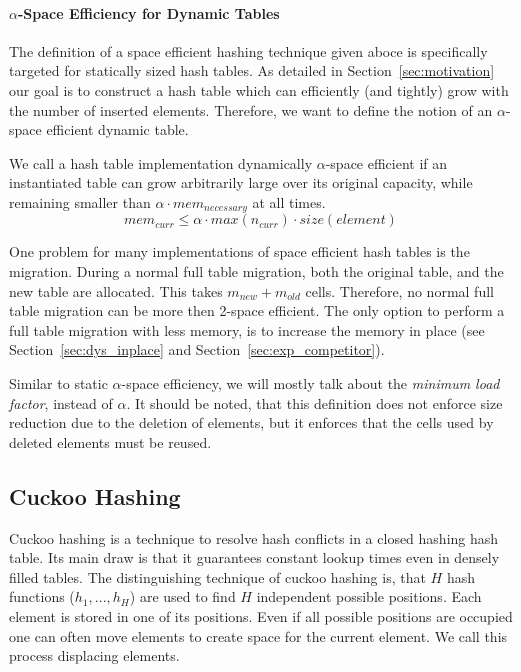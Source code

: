 \documentclass[a4paper,UKenglish]{lipics-v2016}
\begin{document}
\paragraph*{$\alpha$-Space Efficiency for Dynamic Tables}
The definition of a space efficient hashing technique given aboce is
specifically targeted for statically sized hash tables.  As detailed
in Section~\ref{sec:motivation} our goal is to construct a hash table
which can efficiently (and tightly) grow with the number of inserted
elements. Therefore, we want to define the notion of an $\alpha$-space
efficient dynamic table.

We call a hash table implementation dynamically $\alpha$-space
efficient if an instantiated table can grow arbitrarily large over its
original capacity, while remaining smaller than $\alpha\cdot
mem_{necessary}$ at all times.
\[mem_{curr} \leq \alpha\cdot max(n_{curr})\cdot size(element)\]

One problem for many implementations of space efficient hash tables is
the migration.  During a normal full table migration, both the
original table, and the new table are allocated.  This takes
$\textit{m}_{\textit{new}} + \textit{m}_{\textit{old}}$
cells. Therefore, no normal full table migration can be more then
2-space efficient.  The only option to perform a full table migration
with less memory, is to increase the memory in place (see
Section~\ref{sec:dys_inplace} and
Section~\ref{sec:exp_competitor}).

Similar to static $\alpha$-space efficiency, we will mostly talk about
the \emph{minimum load factor}, instead of $\alpha$.  It should be
noted, that this definition does not enforce size reduction due to the
deletion of elements, but it enforces that the cells used by deleted
elements must be reused.

\subsection{Cuckoo Hashing}
Cuckoo hashing is a technique to resolve hash conflicts in a closed
hashing hash table. Its main draw is that it guarantees constant
lookup times even in densely filled tables.  The distinguishing
technique of cuckoo hashing is, that $H$ hash functions ($h_1, ... ,
h_H$) are used to find $H$ independent possible positions. Each
element is stored in one of its positions.  Even if all possible
positions are occupied one can often move elements to create space for
the current element. We call this process displacing elements.
\end{document}
